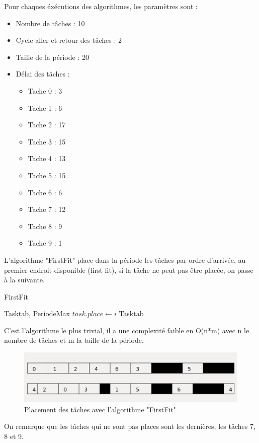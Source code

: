 \documentclass[11pt]{article}
\begin{document}
Pour chaques éxécutions des algorithmes, les paramètres sont :
\begin{itemize}
    \item Nombre de tâches : 10
    \item Cycle aller et retour des tâches : 2
    \item Taille de la période : 20
    \item Délai des tâches :
    \begin{itemize}
        \item Tache 0 : 3
        \item Tache 1 : 6
        \item Tache 2 : 17
        \item Tache 3 : 15
        \item Tache 4 : 13
        \item Tache 5 : 15
        \item Tache 6 : 6
        \item Tache 7 : 12
        \item Tache 8 : 9
        \item Tache 9 : 1
    \end{itemize}
\end{itemize}
\vspace{1mm}
L'algorithme "FirstFit" place dans la période les tâches par ordre d'arrivée, au premier endroit disponible (first fit), si la tâche ne peut pas être placée, on passe à la suivante.
\begin{algorithm}
    \caption{FirstFit}
    \begin{algorithmic}
    \REQUIRE Tasktab, PeriodeMax
            \STATE $task.place \leftarrow i$
         \ENDIF
        \ENDFOR
    \ENDFOR
    \RETURN Tasktab
    \end{algorithmic}
\end{algorithm}

C'est l'algorithme le plus trivial, il a une complexité faible en O(n*m) avec n le nombre de tâches et m la taille de la période.\\

\begin{figure}[!ht]
    \center
    \includegraphics[scale = 0.35]{FirstFit}
    \caption{Placement des tâches avec l'algorithme "FirstFit"}
\end{figure}
\noindent On remarque que les tâches qui ne sont pas places sont les dernières, les tâches 7, 8 et 9.\\
\end{document}
